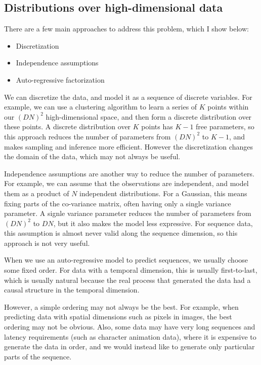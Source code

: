 \subsection{Distributions over high-dimensional data}

There are a few main approaches to address this problem, which I show below:

\begin{itemize}
    \item Discretization
    \item Independence assumptions
    \item Auto-regressive factorization
\end{itemize}

We can discretize the data, and model it as a sequence of discrete variables. For example, we can use a clustering algorithm to learn a series of $K$ points within our $(DN)^2$ high-dimensional space, and then form a discrete distribution over these points. A discrete distribution over $K$ points has $K-1$ free parameters, so this approach reduces the number of parameters from $(DN)^2$ to $K-1$, and makes sampling and inference more efficient. However the discretization changes the domain of the data, which may not always be useful.

Independence assumptions are another way to reduce the number of parameters. For example, we can assume that the observations are independent, and model them as a product of $N$ independent distributions. For a Gaussian, this means fixing parts of the co-variance matrix, often having only a single variance parameter. A signle variance parameter reduces the number of parameters from $(DN)^2$ to $DN$, but it also makes the model less expressive. For sequence data, this assumption is almost never valid along the sequence dimension, so this approach is not very useful.

When we use an auto-regressive model to predict sequences, we usually choose some fixed order. For data with a temporal dimension, this is usually first-to-last, which is usually natural because the real process that generated the data had a causal structure in the temporal dimension.

However, a simple ordering may not always be the best. For example, when predicting data with spatial dimensions such as pixels in images, the best ordering may not be obvious. Also, some data may have very long sequences and latency requirements (such as character animation data), where it is expensive to generate the data in order, and we would instead like to generate only particular parts of the sequence.

